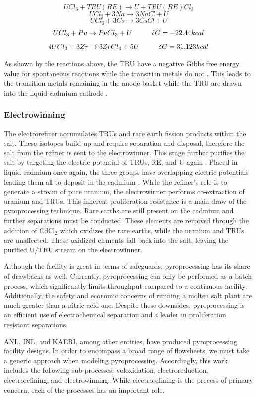 \[ UCl_3+TRU(RE) \rightarrow U + TRU(RE)Cl_3 \]
\[ UCl_3 + 3Na \rightarrow 3NaCl + U \]
\[ UCl_3 + 3Cs \rightarrow 3CsCl + U \]
\[ UCl_3 + Pu \rightarrow PuCl_3 + U \hspace{10mm} \delta G = -22.44kcal \]
\[ 4UCl_3 + 3Zr \rightarrow 3ZrCl_4 + 5U \hspace{10mm} \delta G = 31.123kcal \]

As shown by the reactions above, the TRU have a negative Gibbs free energy value for spontaneous reactions while the transition metals do not \cite{supy}.
This leads to the transition metals remaining in the anode basket while the TRU are drawn into the liquid cadmium cathode \cite{lee_korean_2011}.


\subsubsection{Electrowinning}
The electrorefiner accumulates TRUs and rare earth fission products within the salt.
These isotopes build up and require separation and disposal, therefore the salt from the refiner is sent to the electrowinner.
This stage further purifies the salt by targeting the electric potential of TRUs, RE, and U again \cite{lee_korean_2011,organisation}.
Placed in liquid cadmium once again, the three groups have overlapping electric potentials leading them all to deposit in the cadmium \cite{lee_korean_2011}. 
While the refiner's role is to generate a stream of pure uranium, the electrowinner performs co-extraction of uranium and TRUs.
This inherent proliferation resistance is a main draw of the pyroprocessing technique.
Rare earths are still present on the cadmium and further separations must be conducted.
These elements are removed through the addition of CdCl$_2$ which oxidizes the rare earths, while the uranium and TRUs are unaffected.
These oxidized elements fall back into the salt, leaving the purified U/TRU stream on the electrowinner.


Although the facility is great in terms of safeguards, pyroprocessing has its share of drawbacks as well.
Currently, pyroprocessing can only be performed as a batch process, which significantly limits throughput compared to a continuous facility. 
Additionally, the safety and economic concerns of running a molten salt plant are much greater than a nitric acid one.
Despite these downsides, pyroprocessing is an efficient use of electrochemical separation and a leader in proliferation resistant separations.

ANL, INL, and KAERI, among other entities, have produced pyroprocessing facility designs.
In order to encompass a broad range of flowsheets, we must take a generic approach when modeling pyroprocessing. Accordingly, this work includes the following sub-processes: voloxidation, electroreduction, electrorefining, and electrowinning. 
While electrorefining is the process of primary concern, each of the processes has an important role. 

